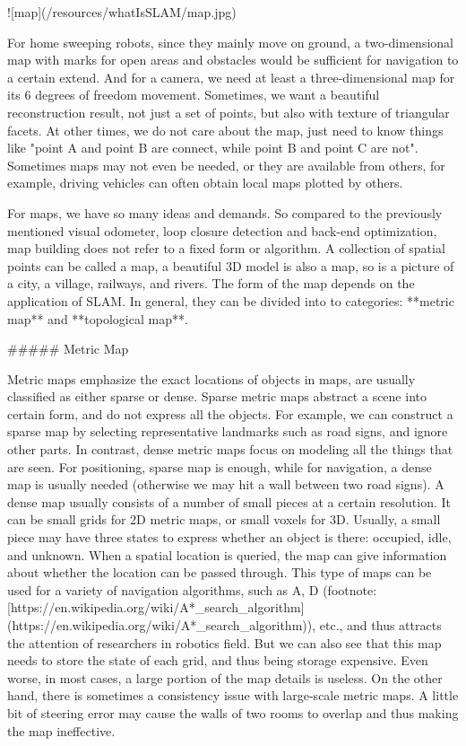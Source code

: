 ![map](/resources/whatIsSLAM/map.jpg)

For home sweeping robots, since they mainly move on ground, a two-dimensional map with marks for open areas and obstacles would be sufficient for navigation to a certain extend. And for a camera, we need at least a three-dimensional map for its 6 degrees of freedom movement. Sometimes, we want a beautiful reconstruction result, not just a set of points, but also with texture of triangular facets. At other times, we do not care about the map, just need to know things like "point A and point B are connect, while point B and point C are not". Sometimes maps may not even be needed, or they are available from others, for example, driving vehicles can often obtain local maps plotted by others.

For maps, we have so many ideas and demands. So compared to the previously mentioned visual odometer, loop closure detection and back-end optimization, map building does not refer to a fixed form or algorithm. A collection of spatial points can be called a map, a beautiful 3D model is also a map, so is a picture of a city, a village, railways, and rivers. The form of the map depends on the application of SLAM. In general, they can be divided into to categories: **metric map** and **topological map**.

##### Metric Map

Metric maps emphasize the exact locations of objects in maps, are usually classified as either sparse or dense. Sparse metric maps abstract a scene into certain form, and do not express all the objects. For example, we can construct a sparse map by selecting representative landmarks such as road signs, and ignore other parts. In contrast, dense metric maps focus on modeling all the things that are seen. For positioning, sparse map is enough, while for navigation, a dense map is usually needed (otherwise we may hit a wall between two road signs). A dense map usually consists of a number of small pieces at a certain resolution. It can be small grids for 2D metric maps, or small voxels for 3D. Usually, a small piece may have three states to express whether an object is there: occupied, idle, and unknown. When a spatial location is queried, the map can give information about whether the location can be passed through. This type of maps can be used for a variety of navigation algorithms, such as A\*, D\* (footnote: [https://en.wikipedia.org/wiki/A*_search_algorithm](https://en.wikipedia.org/wiki/A*_search_algorithm)), etc., and thus attracts the attention of researchers in robotics field. But we can also see that this map needs to store the state of each grid, and thus being storage expensive. Even worse, in most cases, a large portion of the map details is useless. On the other hand, there is sometimes a consistency issue with large-scale metric maps. A little bit of steering error may cause the walls of two rooms to overlap and thus making the map ineffective.

